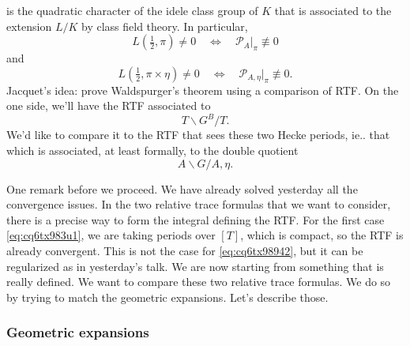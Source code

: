 \documentclass[reqno]{amsart} 
\numberwithin{theorem}{section}
\numberwithin{equation}{section}
\numberwithin{exercise}{section}
\begin{document}
is the quadratic character of the idele class group of $K$ that is associated to the extension $L / K$ by class field theory.  In particular,
\begin{equation*}
  L(\tfrac{1}{2}, \pi) \neq 0
  \quad \iff \quad
  \mathcal{P}_{A} |_\pi \not \equiv 0
\end{equation*}
and
\begin{equation*}
  L(\tfrac{1}{2}, \pi \times \eta) \neq 0
  \quad \iff \quad
  \mathcal{P}_{A, \eta} |_\pi \not \equiv 0.
\end{equation*}
Jacquet's idea: prove Waldspurger's theorem using a comparison of RTF.  On the one side, we'll have the RTF associated to
\begin{equation}\label{eq:cq6tx983u1}
  T \backslash G^B / T.
\end{equation}
We'd like to compare it to the RTF that sees these two Hecke periods, ie.. that which is associated, at least formally, to the double quotient
\begin{equation}\label{eq:cq6tx98942}
  A \backslash G / A, \eta.
\end{equation}

One remark before we proceed.  We have already solved yesterday all the convergence issues.  In the two relative trace formulas that we want to consider, there is a precise way to form the integral defining the RTF.  For the first case \eqref{eq:cq6tx983u1}, we are taking periods over $[T]$, which is compact, so the RTF is already convergent.  This is not the case for \eqref{eq:cq6tx98942}, but it can be regularized as in yesterday's talk.  We are now starting from something that is really defined.  We want to compare these two relative trace formulas.  We do so by trying to match the geometric expansions.  Let's describe those.

\subsubsection{Geometric expansions}\label{sec:cq6tyamec3}
\end{document}
